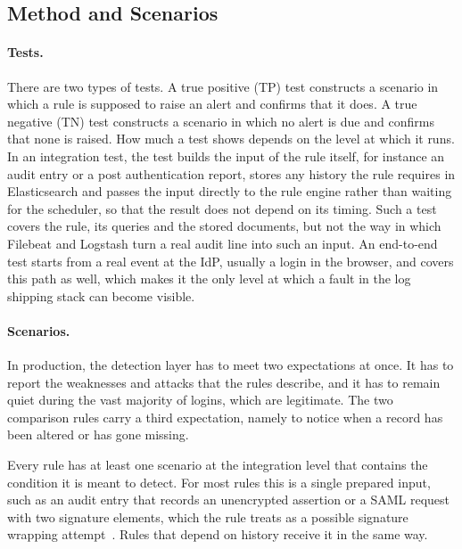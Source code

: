 \documentclass[../main.tex]{subfiles}
\begin{document}
\subsection{Method and Scenarios}\label{subsec:eval-detection-method}

\paragraph{Tests.}
There are two types of tests. 
A true positive (TP) test constructs a scenario in which a rule is supposed to raise an alert and 
confirms that it does. 
A true negative (TN) test constructs a scenario in which no alert is due and confirms that none is 
raised. 
How much a test shows depends on the level at which it runs. 
In an integration test, the test builds the input of the rule itself, for instance an audit entry 
or a post authentication report, stores any history the rule requires in Elasticsearch and passes 
the input directly to the rule engine rather than waiting for the scheduler, so that the result does 
not depend on its timing. 
Such a test covers the rule, its queries and the stored documents, but not the way in which 
Filebeat and Logstash turn a real audit line into such an input. 
An end-to-end test starts from a real event at the IdP, usually a login in the browser, and covers this 
path as well, which makes it the only level at which a fault in the log shipping stack can become visible. 

\paragraph{Scenarios.}
In production, the detection layer has to meet two expectations at once. 
It has to report the weaknesses and attacks that the rules describe, and it has to remain quiet 
during the vast majority of logins, which are legitimate. 
The two comparison rules carry a third expectation, namely to notice when a record has been altered 
or has gone missing. 

Every rule has at least one scenario at the integration level that contains the condition it is 
meant to detect. 
For most rules this is a single prepared input, such as an audit entry that records an unencrypted 
assertion or a SAML request with two signature elements, which the rule treats as a possible signature 
wrapping attempt~\cite{BreakingSAML}. 
Rules that depend on history receive it in the same way. 
\end{document}
